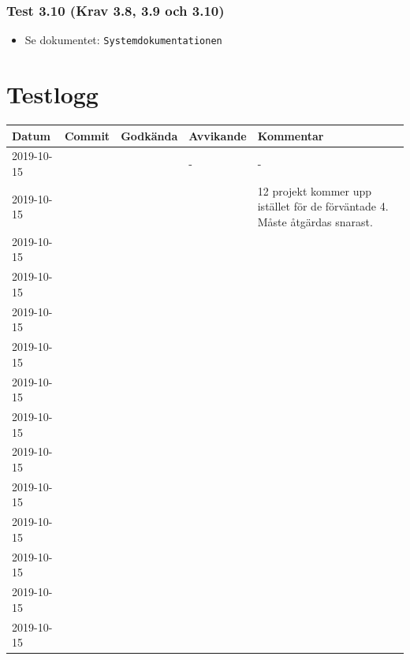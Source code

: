 \documentclass{TDP003mall}
\begin{document}
\subsubsection*{Test 3.10 (Krav 3.8, 3.9 och 3.10)}
\begin{itemize}
\item[] Se dokumentet: \texttt{Systemdokumentationen}
\end{itemize}





\section{Testlogg}

\begin{tabular}{|l|l|l|l|l|}
  \hline
  Datum & Commit & Godkända & Avvikande & Kommentar \\ [0.5ex]
  \hline
  2019-10-15 &  &  & - & - \\
  \hline
  \hline
  2019-10-15 &  &  &  & 12 projekt kommer upp istället för de förväntade 4. Måste åtgärdas snarast.\\
  \hline
  \hline
  2019-10-15 &  &  &  & \\
  \hline
  \hline
  2019-10-15 &  &  &  & \\
  \hline
  \hline
  2019-10-15 &  &  &  & \\
  \hline
  \hline
  2019-10-15 &  &  &  & \\
  \hline
  \hline
  2019-10-15 &  &  &  & \\
  \hline
  \hline
  2019-10-15 &  &  &  & \\
  \hline
  \hline
  2019-10-15 &  &  &  & \\
  \hline
  \hline
  2019-10-15 &  &  &  & \\
  \hline
  \hline
  2019-10-15 &  &  &  & \\
  \hline
  \hline
  2019-10-15 &  &  &  & \\
  \hline
  \hline
  2019-10-15 &  &  &  & \\
  \hline
  \hline
  2019-10-15 &  &  &  & \\
  \hline
\end{tabular}





\end{document}
